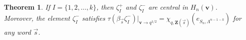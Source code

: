 \documentclass[submission]{FPSAC2025}
\newtheorem{thm}{Theorem}
\newcommand{\dfemph}[1]{\textcolor{blue}{\emph{#1}}}
\newcommand{\x}{\mathbf{v}}
\newcommand{\CharQ}[1]{\chi_{q, #1}}
\begin{document}
\begin{thm}\label{thm:asc}
If $I = \{1, 2, \ldots, k\}$, then $\zeta_I^+$ and $\zeta_I^-$ are central in $H_n(\x)$.
Moreover, the element $\zeta_I^-$ satisfies $\tau(\beta_{\vec{s}}\zeta_I^-)|_{\x \to q^{1/2}} = \CharQ{\mathbf{Z}(\vec{s})}(e_{S_n, \Lambda^{n - 1 - k}})$ for any word $\vec{s}$.
\end{thm}




\end{document}
